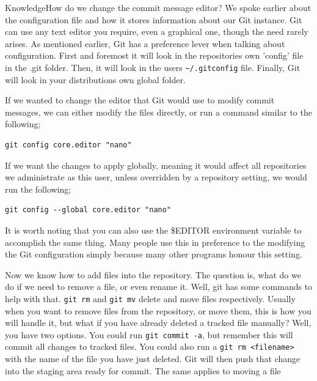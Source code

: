 \begin{callout}{Knowledge}{How do we change the commit message editor?}
We spoke earlier about the configuration file and how it stores information about our Git instance.  Git can use any text editor you require, even a graphical one, though the need rarely arises.  As mentioned earlier, Git has a preference lever when talking about configuration.  First and foremost it will look in the repositories own 'config' file in the .git folder.  Then, it will look in the users \texttt{\textasciitilde/.gitconfig} file.  Finally, Git will look in your distributions own global folder.  

If we wanted to change the editor that Git would use to modify commit messages, we can either modify the files directly, or run a command similar to the following;

\begin{Verbatim}[frame=leftline,framerule=1mm,fontsize=\relsize{-3}] 
git config core.editor "nano"
\end{Verbatim}

If we want the changes to apply globally, meaning it would affect all repositories we administrate as this user, unless overridden by a repository setting, we would run the following;

\begin{Verbatim}[frame=leftline,framerule=1mm,fontsize=\relsize{-3}] 
git config --global core.editor "nano"
\end{Verbatim}

It is worth noting that you can also use the \$EDITOR environment variable to accomplish the same thing.  Many people use this in preference to the modifying the Git configuration simply because many other programs honour this setting.
\end{callout}

Now we know how to add files into the repository.  The question is, what do we do if we need to remove a file, or even rename it.  Well, git has some commands to help with that.  \texttt{git rm} and \texttt{git mv} delete and move files respectively.  Usually when you want to remove files from the repository, or move them, this is how you will handle it, but what if you have already deleted a tracked file manually?  Well, you have two options.  You could run \texttt{git commit -a}, but remember this will commit all changes to tracked files.  You could also run a \texttt{git rm <filename>} with the name of the file you have just deleted.  Git will then push that change into the staging area ready for commit.  The same applies to moving a file

